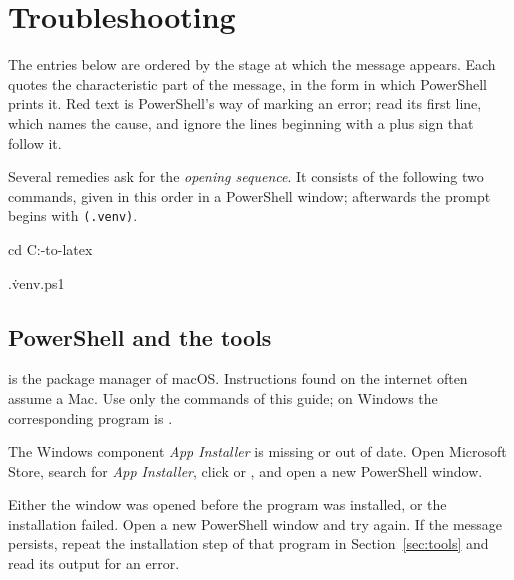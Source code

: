 \section{Troubleshooting}
\label{sec:trouble}

The entries below are ordered by the stage at which the message appears. Each quotes the
characteristic part of the message, in the form in which PowerShell prints it. Red text is
PowerShell's way of marking an error; read its first line, which names the cause, and ignore
the lines beginning with a plus sign that follow it.

Several remedies ask for the \emph{opening sequence}. It consists of the following two
commands, given in this order in a PowerShell window; afterwards the prompt begins with
\texttt{(.venv)}.
\begin{ps}
cd C:\camera-to-latex
\end{ps}
\begin{ps}
.\.venv\Scripts\Activate.ps1
\end{ps}

\subsection{PowerShell and the tools}

\cause {} is the package manager of macOS. Instructions found on the internet often assume a
Mac.
\remedy Use only the commands of this guide; on Windows the corresponding program is .

\cause The Windows component \emph{App Installer} is missing or out of date.
\remedy Open Microsoft Store, search for \emph{App Installer}, click  or , and
open a new PowerShell window.

\cause Either the window was opened before the program was installed, or the installation failed.
\remedy Open a new PowerShell window and try again. If the message persists, repeat the installation
step of that program in Section~\ref{sec:tools} and read its output for an error.

